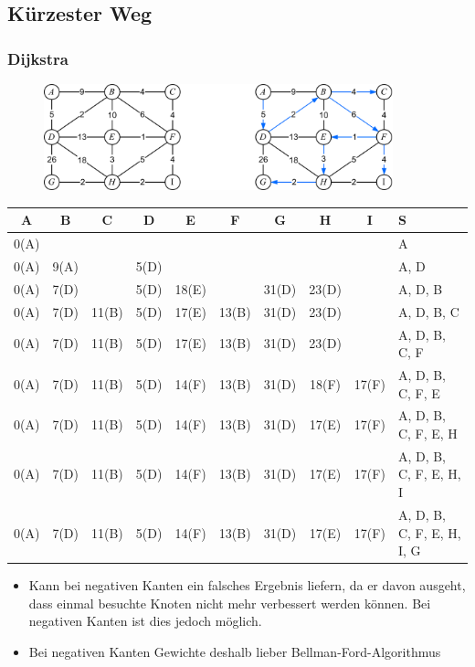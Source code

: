 \subsection{Kürzester Weg}

\subsubsection*{Dijkstra}

\begin{figure}[h]
\centering
\includegraphics[width=0.9\textwidth]{graphics/dijkstra.png}
\end{figure}

\begin{table}[h]
\centering
\begin{tabular}{c|c|c|c|c|c|c|c|c||l}
A & B & C & D & E & F & G & H & I & S\\
\hline
0(A) &      & & & & & & & & A\\
0(A) & 9(A) &       & 5(D) & & & & & & A, D\\
0(A) & 7(D) &       & 5(D) & 18(E) & & 31(D) & 23(D) & & A, D, B\\
0(A) & 7(D) & 11(B) & 5(D) & 17(E) & 13(B) & 31(D) & 23(D) & & A, D, B, C\\
0(A) & 7(D) & 11(B) & 5(D) & 17(E) & 13(B) & 31(D) & 23(D) & & A, D, B, C, F\\
0(A) & 7(D) & 11(B) & 5(D) & 14(F) & 13(B) & 31(D) & 18(F) & 17(F) & A, D, B, C, F, E\\
0(A) & 7(D) & 11(B) & 5(D) & 14(F) & 13(B) & 31(D) & 17(E) & 17(F) & A, D, B, C, F, E, H\\
0(A) & 7(D) & 11(B) & 5(D) & 14(F) & 13(B) & 31(D) & 17(E) & 17(F) & A, D, B, C, F, E, H, I\\
0(A) & 7(D) & 11(B) & 5(D) & 14(F) & 13(B) & 31(D) & 17(E) & 17(F) & A, D, B, C, F, E, H, I, G
\end{tabular}
\end{table}

\begin{itemize}
\item Kann bei negativen Kanten ein falsches Ergebnis liefern, da er davon ausgeht, dass einmal besuchte Knoten nicht mehr verbessert werden können. Bei negativen Kanten ist dies jedoch möglich.
\item Bei negativen Kanten Gewichte deshalb lieber Bellman-Ford-Algorithmus
\end{itemize}

